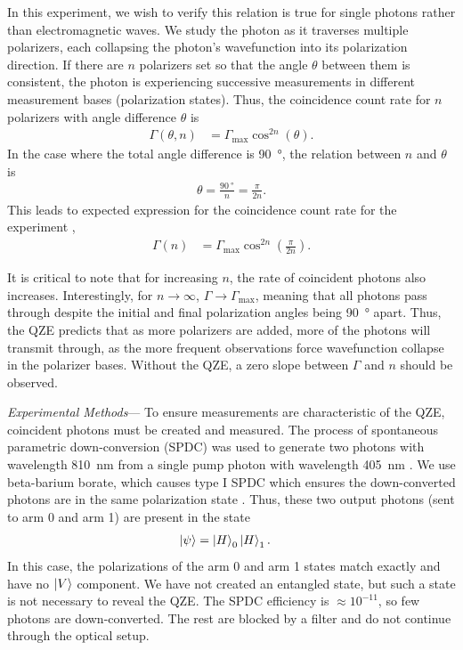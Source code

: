 \documentclass[%
reprint,
superscriptaddress,
nofootinbib,
nobibnotes,
nobalancelastpage,
amsmath,amssymb,
aps, 
prl,
floatfix,
]{revtex4-2}
\renewcommand{\section}[1]{\textit{#1}---\ignorespaces}
\begin{document}
In this experiment, we wish to verify this relation is true for single photons rather than electromagnetic waves. We study the photon as it traverses multiple polarizers, each collapsing the photon's wavefunction into its polarization direction. If there are $n$ polarizers set so that the angle $\theta$ between them is consistent, the photon is experiencing successive measurements in different measurement bases (polarization states). Thus, the coincidence count rate for $n$ polarizers with angle difference $\theta$ is
\begin{align}
    \Gamma(\theta,n) &= \Gamma_\text{max}\cos^{2n}(\theta)\nonumber.
\end{align}
In the case where the total angle difference is \qty{90}{\degree}, the relation between $n$ and $\theta$ is
\begin{align}
    \theta = \frac{\qty{90}{\degree}}{n} = \frac{\pi}{2n}\label{eq:angle}.
\end{align}
This leads to expected expression for the coincidence count rate for the experiment \cite{kwiatExperimentalRealizationInteractionfree1995,schuttevaarMalusLawDerived2024},
\begin{align}
    \Gamma(n) &= \Gamma_\text{max}\cos^{2n}\left(\frac{\pi}{2n}\right)\label{eq:ratevsn}.
\end{align}

It is critical to note that for increasing $n$, the rate of coincident photons also increases. Interestingly, for $n\rightarrow\infty$, $\Gamma\rightarrow\Gamma_\text{max}$, meaning that all photons pass through despite the initial and final polarization angles being \qty{90}{\degree} apart. Thus, the QZE predicts that as more polarizers are added, more of the photons will transmit through, as the more frequent observations force wavefunction collapse in the polarizer bases. Without the QZE, a zero slope between $\Gamma$ and $n$ should be observed.

\section{Experimental Methods}
To ensure measurements are characteristic of the QZE, coincident photons must be created and measured. The process of spontaneous parametric down-conversion (SPDC) was used to generate two photons with wavelength \qty{810}{\nano\meter} from a single pump photon with wavelength \qty{405}{\nano\meter} \cite{klyskoPhotonsNonlinearOptics1988,hausWavesFieldsOptoelectronics1984,qutoolsgmbhQutoolsQuEDDatasheet2022}. We use beta-barium borate, which causes type I SPDC which ensures the down-converted photons are in the same polarization state \cite{qutoolsgmbhQuEDManual2021}. Thus, these two output photons (sent to arm 0 and arm 1) are present in the state
\begin{align}
    \ket{\psi} &= \ket{H}_0 \ket{H}_1 \nonumber.
\end{align} 
In this case, the polarizations of the arm 0 and arm 1 states match exactly and have no $\ket{V}$ component. We have not created an entangled state, but such a state is not necessary to reveal the QZE. The SPDC efficiency is $\approx10^{-11}$, so few photons are down-converted. The rest are blocked by a filter and do not continue through the optical setup.
\end{document}
